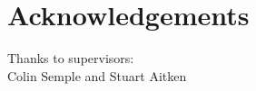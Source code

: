 \documentclass{beamer}
\begin{document}
\section{Acknowledgements}

{
\begin{frame}{}
\begin{tcolorbox}[colback=blue!40!black,colframe=blue!40!black]
\begin{center}
{
{\small Thanks to supervisors:} \\ Colin Semple and
Stuart Aitken
}
\end{center}
\end{tcolorbox}

\end{frame}
}
\end{document}
